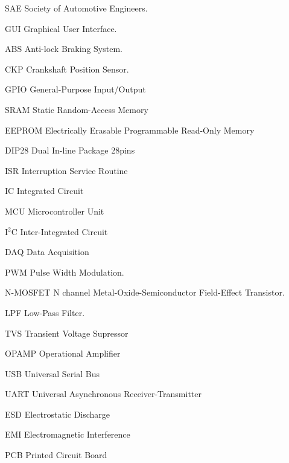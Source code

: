 \begin{siglas}
  \item[SAE] Society of Automotive Engineers.
  \item[GUI] Graphical User Interface.
  \item[ABS] Anti-lock Braking System.
  \item[CKP] Crankshaft Position Sensor.
  \item[GPIO] General-Purpose Input/Output
  \item[SRAM] Static Random-Access Memory
  \item[EEPROM] Electrically Erasable Programmable Read-Only Memory
  \item[DIP28] Dual In-line Package 28pins
  \item[ISR] Interruption Service Routine
  \item[IC] Integrated Circuit
  \item[MCU] Microcontroller Unit
  \item[I$^2$C] Inter-Integrated Circuit
  \item[DAQ] Data Acquisition
  \item[PWM] Pulse Width Modulation.
  \item[N-MOSFET] N channel Metal-Oxide-Semiconductor Field-Effect Transistor.
  \item[LPF] Low-Pass Filter.
  \item[TVS] Transient Voltage Supressor
  \item[OPAMP] Operational Amplifier
  \item[USB] Universal Serial Bus
  \item[UART] Universal Asynchronous Receiver-Transmitter
  \item[ESD] Electrostatic Discharge
  \item[EMI] Electromagnetic Interference
  \item[PCB] Printed Circuit Board

\end{siglas}
